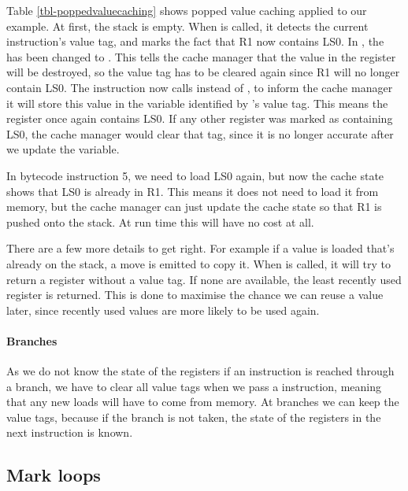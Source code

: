 Table \ref{tbl-poppedvaluecaching} shows popped value caching applied to our example. At first, the stack is empty. When  is called, it detects the current instruction's value tag, and marks the fact that R1 now contains LS0. In , the  has been changed to . This tells the cache manager that the value in the register will be destroyed, so the value tag has to be cleared again since R1 will no longer contain LS0. The  instruction now calls  instead of  , to inform the cache manager it will store this value in the variable identified by 's value tag. This means the register once again contains LS0. If any other register was marked as containing LS0, the cache manager would clear that tag, since it is no longer accurate after we update the variable.

In bytecode instruction 5, we need to load LS0 again, but now the cache state shows that LS0 is already in R1. This means it does not need to load it from memory, but the cache manager can just update the cache state so that R1 is pushed onto the stack. At run time this  will have no cost at all.

There are a few more details to get right. For example if a value is loaded that's already on the stack, a move is emitted to copy it. When  is called, it will try to return a register without a value tag. If none are available, the least recently used register is returned. This is done to maximise the chance we can reuse a value later, since recently used values are more likely to be used again.

\paragraph{Branches} As we do not know the state of the registers if an instruction is reached through a branch, we have to clear all value tags when we pass a  instruction, meaning that any new loads will have to come from memory. At branches we can keep the value tags, because if the branch is not taken, the state of the registers in the next instruction is known.

\subsection{Mark loops}
\label{sec-optimisation-markloops}


